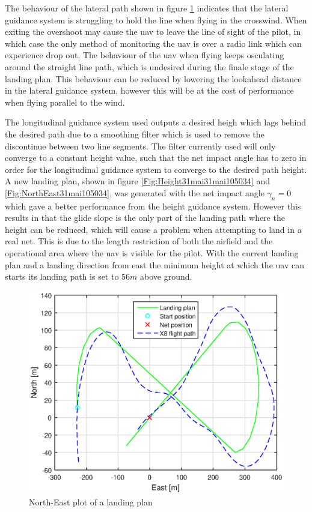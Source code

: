 The behaviour of the lateral path shown in figure \ref{Fig:NorthEast31mai103029} indicates that the lateral guidance system is struggling to hold the line when flying in the crosswind. When exiting the overshoot may cause the \gls{uav} to leave the line of sight of the pilot, in which case the only method of monitoring the \gls{uav} is over a radio link which can experience drop out. The behaviour of the \gls{uav} when flying keeps osculating around the straight line path, which is undesired during the finale stage of the landing plan. This behaviour can be reduced by lowering the lookahead distance in the lateral guidance system, however this will be at the cost of performance when flying parallel to the wind.

The longitudinal guidance system used outputs a desired heigh which lags behind the desired path due to a smoothing filter which is used to remove the discontinue between two line segments. The filter currently used will only converge to a constant height value, such that the net impact angle has to zero in order for the longitudinal guidance system to converge to the desired path height. A new landing plan, shown in figure \ref{Fig:Height31mai31mai105034} and \ref{Fig:NorthEast31mai105034}, was generated with the net impact angle $\gamma_n = 0$ which gave a better performance from the height guidance system. However this results in that the glide slope is the only part of the landing path where the height can be reduced, which will cause a problem when attempting to land in a real net. This is due to the length restriction of both the airfield and the operational area where the \gls{uav} is visible for the pilot. With the current landing plan and a landing direction from east the minimum height at which the \gls{uav} can starts its landing path is set to $56 m$ above ground. 
\newpage
\begin{figure}[H]
	\centering
		\includegraphics[scale=0.7]{figs/Experiment/NorthEast31mai103029.eps}
		\caption{North-East plot of a landing plan}
		\label{Fig:NorthEast31mai103029}
\end{figure}
